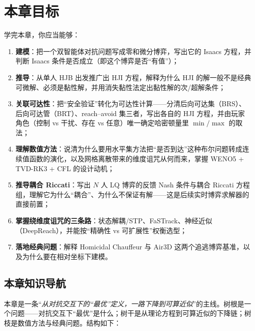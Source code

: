 \section*{本章目标}
学完本章，你应当能够：
\begin{enumerate}
  \item \textbf{建模}：把一个双智能体对抗问题写成零和微分博弈，写出它的 Isaacs 方程，并判断 Isaacs 条件是否成立（即这个博弈是否“有值”）；
  \item \textbf{推导}：从单人 HJB 出发推广出 HJI 方程，解释为什么 HJI 的解一般不是经典可微解、必须是黏性解，并用消失黏性法定出黏性解的次/超解条件；
  \item \textbf{关联可达性}：把“安全验证”转化为可达性计算——分清后向可达集（BRS）、后向可达管（BRT）、reach--avoid 集三者，写出各自的 HJI 方程，并由玩家角色（控制 vs 干扰、存在 vs 任意）唯一确定哈密顿量里 $\min/\max$ 的取法；
  \item \textbf{理解数值方法}：说清为什么要用水平集方法把“是否到达”这种布尔问题转成连续值函数的演化，以及网格离散带来的维度诅咒从何而来，掌握 WENO5 + TVD-RK3 + CFL 的设计动机；
  \item \textbf{推导耦合 Riccati}：写出 $N$ 人 LQ 博弈的反馈 Nash 条件与耦合 Riccati 方程组，理解它为什么“耦合”、为什么不保证有解——这是后续实时博弈求解器的直接前置；
  \item \textbf{掌握绕维度诅咒的三条路}：状态解耦/STP、FaSTrack、神经近似（DeepReach），并能按“精确性 vs 可扩展性”权衡选型；
  \item \textbf{落地经典问题}：解释 Homicidal Chauffeur 与 Air3D 这两个追逃博弈基准，以及为什么要在相对坐标下建模。
\end{enumerate}

\subsection*{本章知识导航}
本章是一条“\emph{从对抗交互下的“最优”定义，一路下降到可算近似}”的主线。树根是一个问题——对抗交互下“最优”是什么；树干是从理论方程到可算近似的下降链；树枝是数值方法与经典问题。结构如下：

